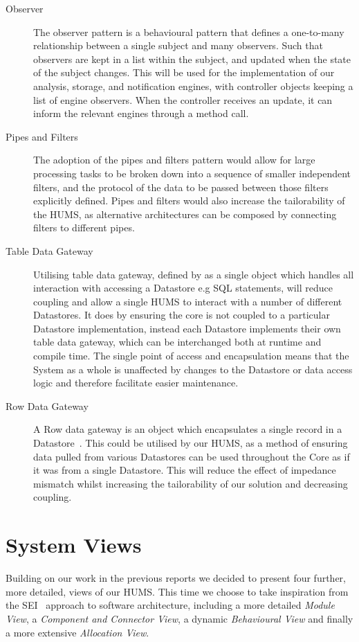 \documentclass[10pt,a4paper]{article}
\begin{document}
\begin{description}
\item[Observer] The observer pattern is a behavioural pattern that defines a one-to-many relationship between a single subject and many observers. Such that observers are kept in a list within the subject, and updated when the state of the subject changes. This will be used for the implementation of our analysis, storage, and notification engines, with controller objects keeping a list of engine observers. When the controller receives an update, it can inform the relevant engines through a method call.
\item[Pipes and Filters]The adoption of the pipes and filters pattern would allow for large processing tasks to be broken down into a sequence of smaller independent filters, and the protocol of the data to be passed between those filters explicitly defined. Pipes and filters would also increase the tailorability of the HUMS, as alternative architectures can be composed by connecting filters to different pipes. 
\item[Table Data Gateway]  Utilising table data gateway, defined by \cite{fowler2002patterns} as a single object which handles all interaction with accessing a Datastore e.g SQL statements, will reduce coupling and allow a single HUMS to interact with a number of different Datastores. It does by ensuring the core is not coupled to a particular Datastore implementation, instead each Datastore implements their own table data gateway, which can be interchanged both at runtime and compile time. The single point of access and encapsulation means that the System as a whole is unaffected by changes to the Datastore or data access logic and therefore facilitate easier maintenance.
\item[Row Data Gateway] A Row data gateway is an object which encapsulates a single record in a Datastore~\cite{fowler2002patterns}. This could be utilised by our HUMS, as a method of ensuring data pulled from various Datastores can be used throughout the Core as if it was from a single Datastore. This will reduce the effect of impedance mismatch whilst increasing the tailorability of our solution and decreasing coupling.
\end{description}

\section{System Views} 
Building on our work in the previous reports we decided to present four further, more detailed, views of our HUMS. This time we choose to take inspiration from the SEI~\cite{Bass98} approach to software architecture, including a more detailed \emph{Module View}, a \emph{Component and Connector View}, a dynamic \emph{Behavioural View} and finally a more extensive \emph{Allocation View}.
\end{document}
